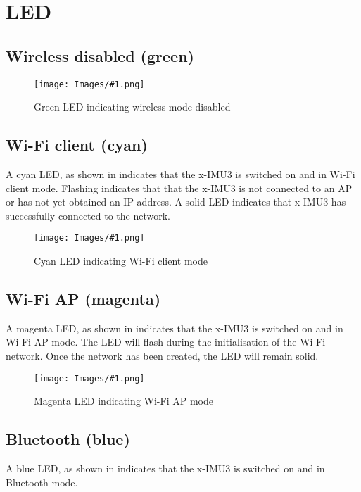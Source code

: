 \section{\acs{LED}}
\label{sec:led}

\newcommand{\ledFigure}[2]{
    \begin{figure}[H]
        \centering
        \texttt{[image: Images/\#1.png]}
        \caption{#2}
        \label{fig:#1}
    \end{figure}
}

\subsection{Wireless disabled (green)}

\ledFigure{greenLed}{Green \acs{LED} indicating wireless mode disabled}

\subsection{Wi-Fi client (cyan)}

A cyan \ac{LED}, as shown in  indicates that the x-IMU3 is switched on and in Wi-Fi client mode.  Flashing indicates that that the x-IMU3 is not connected to an \ac{AP} or has not yet obtained an \ac{IP} address.  A solid \ac{LED} indicates that x-IMU3 has successfully connected to the network.

\ledFigure{cyanLed}{Cyan \acs{LED} indicating Wi-Fi client mode}

\subsection{Wi-Fi AP (magenta)}

A magenta \ac{LED}, as shown in  indicates that the x-IMU3 is switched on and in Wi-Fi \ac{AP} mode.  The \ac{LED} will flash during the initialisation of the Wi-Fi network.  Once the network has been created, the \ac{LED} will remain solid.

\ledFigure{magentaLed}{Magenta \acs{LED} indicating Wi-Fi \acs{AP} mode}

\subsection{Bluetooth (blue)}

A blue \ac{LED}, as shown in  indicates that the x-IMU3 is switched on and in Bluetooth mode.

